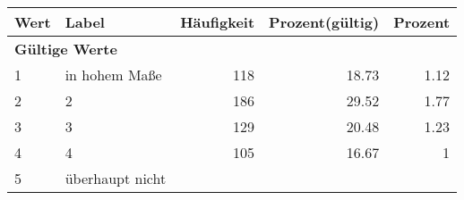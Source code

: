      \begin{longtable}{lXrrr}
     \toprule
     \textbf{Wert} & \textbf{Label} & \textbf{Häufigkeit} & \textbf{Prozent(gültig)} & \textbf{Prozent} \\
     \endhead
     \midrule
     \multicolumn{5}{l}{\textbf{Gültige Werte}}\\

     1 &
     \multicolumn{1}{X}{ in hohem Maße   } &


       \num{118} &
       \num[round-mode=places,round-precision=2]{18.73} &
         \num[round-mode=places,round-precision=2]{1.12} \\

     2 &
     \multicolumn{1}{X}{ 2   } &


       \num{186} &
       \num[round-mode=places,round-precision=2]{29.52} &
         \num[round-mode=places,round-precision=2]{1.77} \\

     3 &
     \multicolumn{1}{X}{ 3   } &


       \num{129} &
       \num[round-mode=places,round-precision=2]{20.48} &
         \num[round-mode=places,round-precision=2]{1.23} \\

     4 &
     \multicolumn{1}{X}{ 4   } &


       \num{105} &
       \num[round-mode=places,round-precision=2]{16.67} &
         \num[round-mode=places,round-precision=2]{1} \\

     5 &
     \multicolumn{1}{X}{ überhaupt nicht   } &



\end{longtable}
